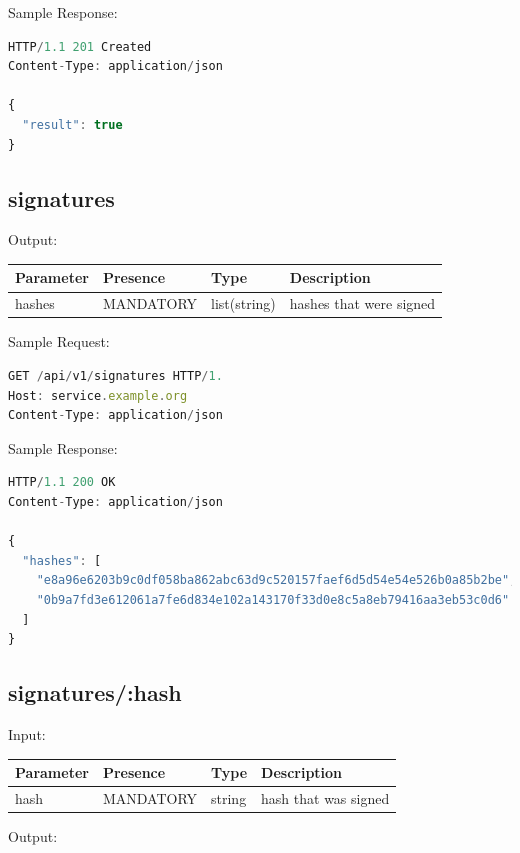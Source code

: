 Sample Response:

\begin{lstlisting}[caption={sign response}, captionpos=b, language=JavaScript, label={lst:signresponse}]
HTTP/1.1 201 Created
Content-Type: application/json

{
  "result": true
}
\end{lstlisting}

\subsection{signatures}
Output:

\begin{tabular}{|l|l|l|l|}
	\hline
	Parameter & Presence & Type & Description \\ \hline
	hashes & MANDATORY & list(string) & hashes that were signed \\ \hline
\end{tabular}

Sample Request:

\begin{lstlisting}[caption={signatures request}, captionpos=b, language=JavaScript, label={lst:signaturesrequest}]
GET /api/v1/signatures HTTP/1.
Host: service.example.org
Content-Type: application/json
\end{lstlisting}

Sample Response:

\begin{lstlisting}[caption={signatures response}, captionpos=b, language=JavaScript, label={lst:signaturesresponse}]
HTTP/1.1 200 OK
Content-Type: application/json

{
  "hashes": [
    "e8a96e6203b9c0df058ba862abc63d9c520157faef6d5d54e54e526b0a85b2be",
    "0b9a7fd3e612061a7fe6d834e102a143170f33d0e8c5a8eb79416aa3eb53c0d6"
  ]
}
\end{lstlisting}

\subsection{signatures/:hash}
Input:

\begin{tabular}{|l|l|l|l|}
	\hline
	Parameter & Presence & Type & Description \\ \hline
	hash & MANDATORY & string & hash that was signed \\ \hline
\end{tabular}

Output:

